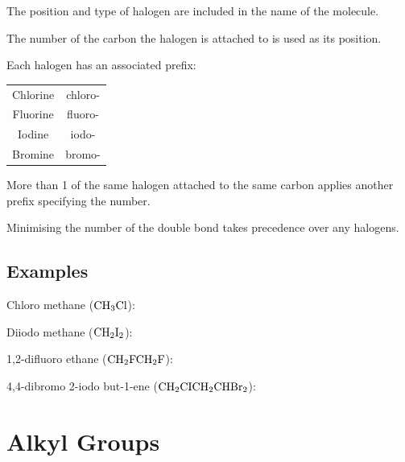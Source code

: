 \documentclass[a4paper,11pt]{article}
\begin{document}
The position and type of halogen are included in the name of the molecule.

The number of the carbon the halogen is attached to is used as its position.

Each halogen has an associated prefix:

\begin{center}
\begin{tabular}{c|c}
Chlorine & chloro- \\
Fluorine & fluoro- \\
Iodine   & iodo-   \\
Bromine  & bromo-  \\
\end{tabular}
\end{center}

More than 1 of the same halogen attached to the same carbon applies another
prefix specifying the number.

Minimising the number of the double bond takes precedence over any halogens.


\subsection{Examples}

Chloro methane ($\ce{CH3Cl}$):

\begin{center}
\end{center}

Diiodo methane ($\ce{CH2I2}$):

\begin{center}
\end{center}

1,2-difluoro ethane ($\ce{CH2FCH2F}$):

\begin{center}
\end{center}

4,4-dibromo 2-iodo but-1-ene ($\ce{CH2CICH2CHBr2}$):

\begin{center}
\end{center}



\section{Alkyl Groups}
\end{document}
